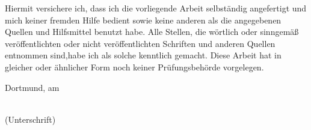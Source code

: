 
Hiermit versichere ich, dass ich die vorliegende Arbeit selbständig angefertigt und mich keiner fremden Hilfe bedient sowie keine anderen als die angegebenen Quellen und Hilfsmittel benutzt habe. Alle Stellen, die wörtlich oder sinngemäß veröffentlichten oder nicht veröffentlichten Schriften und anderen Quellen entnommen sind,habe ich als solche kenntlich gemacht. Diese Arbeit hat in gleicher oder ähnlicher Form noch keiner Prüfungsbehörde vorgelegen.
		
\vspace{4cm}
		
\noindent
\begin{minipage}[h]{0.4\linewidth}
	Dortmund, am \dotfill\\
	\vspace*{2.5mm}
\end{minipage}
	\hspace*{0.1\linewidth}
	\begin{minipage}[h]{0.5\linewidth}
	\begin{center}
		\dotfill\\
		(Unterschrift)
	\end{center}
\end{minipage}